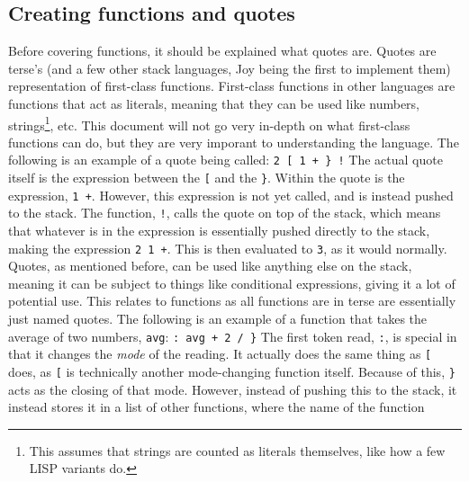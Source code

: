 \documentclass[12pt]{report}
\begin{document}
  \subsection{Creating functions and quotes}
  Before covering functions, it should be explained what quotes are.  Quotes are
  terse's (and a few other stack languages, Joy being the first to implement them)
  representation of first-class functions.  First-class functions in other languages
  are functions that act as literals, meaning that they can be used like numbers,
  strings\footnote{This assumes that strings are counted as literals themselves, like
  how a few LISP variants do.}, etc.  This document will not go very in-depth on what
  first-class functions can do, but they are very imporant to understanding the
  language.  The following is an example of a quote being called:
  \newline\newline
  \verb|2 [ 1 + } !|
  \newline\newline
  The actual quote itself is the expression between the \verb|[| and the \verb|}|.
  Within the quote is the expression, \verb|1 +|.  However, this expression is not
  yet called, and is instead pushed to the stack.  The function, \verb|!|, calls
  the quote on top of the stack, which means that whatever is in the expression is
  essentially pushed directly to the stack, making the expression \verb|2 1 +|.
  This is then evaluated to \verb|3|, as it would normally.  Quotes, as mentioned
  before, can be used like anything else on the stack, meaning it can be subject
  to things like conditional expressions, giving it a lot of potential use.
  \newline\newline
  This relates to functions as all functions are in terse are essentially just named
  quotes.  The following is an example of a function that takes the average of two
  numbers, \verb|avg|:
  \newline\newline
  \verb|: avg + 2 / }|
  \newline\newline
  The first token read, \verb|:|, is special in that it changes the \emph{mode} of
  the reading.  It actually does the same thing as \verb|[| does, as \verb|[| is
  technically another mode-changing function itself.  Because of this, \verb|}|
  acts as the closing of that mode.  However, instead of pushing this to the stack,
  it instead stores it in a list of other functions, where the name of the function
\end{document}
